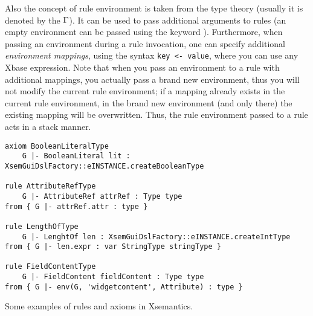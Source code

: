 Also the concept of rule environment is taken from the type theory (usually it
is denoted by the $\Gamma$).  It can be used to pass additional arguments to rules
(an empty environment can be passed using the keyword ).
Furthermore, when passing an environment during a rule invocation, one
can specify additional \emph{environment mappings}, using the syntax
\lstinline[breakatwhitespace=false,breaklines=true]!key <- value!, 
where you can use any Xbase expression.
Note that when you pass an environment to a rule with additional mappings,
you actually pass a brand new environment, thus you will not modify the
current rule environment; if a mapping already exists in the current rule
environment, in the brand new environment (and only there) the existing mapping
will be overwritten.  Thus, the rule environment passed to a rule acts
in a stack manner.


\begin{listing}[tb]
\begin{lstlisting}[language=xsemantics]
axiom BooleanLiteralType
	G |- BooleanLiteral lit : XsemGuiDslFactory::eINSTANCE.createBooleanType

rule AttributeRefType
	G |- AttributeRef attrRef : Type type
from { G |- attrRef.attr : type }

rule LengthOfType
	G |- LenghtOf len : XsemGuiDslFactory::eINSTANCE.createIntType
from { G |- len.expr : var StringType stringType }

rule FieldContentType
	G |- FieldContent fieldContent : Type type
from { G |- env(G, 'widgetcontent', Attribute) : type }
\end{lstlisting}
\caption{Some examples of rules and axioms in Xsemantics.}
\label{lst:xsem-firstrules}
\end{listing}

